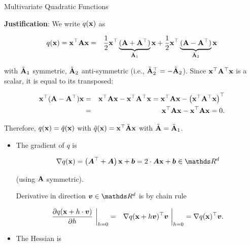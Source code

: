 \begin{vbframe}{Multivariate Quadratic Functions}
  
  \textbf{Justification}: We write $q(\mathbf{x})$ as
  
  \vspace*{-0.3cm}
  
  \begin{eqnarray*}
    q(\mathbf{x}) = \mathbf{x}^\top \mathbf{A} \mathbf{x} &=& \frac{1}{2} \mathbf{x}^\top \underbrace{(\mathbf{A} + \mathbf{A}^\top)}_{\tilde {\mathbf{A}}_1} \mathbf{x} + \frac{1}{2} \mathbf{x}^\top \underbrace{(\mathbf{A} - \mathbf{A}^\top)}_{\tilde {\mathbf{A}}_2} \mathbf{x}
  \end{eqnarray*}
  
  with $\tilde {\mathbf{A}}_1$ symmetric, $\tilde {\mathbf{A}}_2$ anti-symmetric (i.e., $\tilde {\mathbf{A}}_2^\top = - \tilde {\mathbf{A}}_2$). Since $\mathbf{x}^\top \mathbf{A}^\top \mathbf{x}$ is a scalar, it is equal to its transposed: 
  
  \vspace*{-0.3cm}
  
  \begin{eqnarray*}
     \mathbf{x}^\top (\mathbf{A} - \mathbf{A}^\top) \mathbf{x} &=&  \mathbf{x}^\top \mathbf{A} \mathbf{x} - \mathbf{x}^\top \mathbf{A}^\top \mathbf{x} =  \mathbf{x}^\top \mathbf{A} \mathbf{x} - \left(\mathbf{x}^\top \mathbf{A}^\top \mathbf{x}\right)^\top \\
     &=& \mathbf{x}^\top \mathbf{A} \mathbf{x} - \mathbf{x}^\top \mathbf{A} \mathbf{x}  = 0.
  \end{eqnarray*}
  
  Therefore, $q(\mathbf{x}) = \tilde q(\mathbf{x})$ with $\tilde q(\mathbf{x}) = \mathbf{x}^\top \tilde {\mathbf{A}} \mathbf{x}$ with $\tilde {\mathbf{A}} = \tilde {\mathbf{A}}_1$. 
  
  \framebreak 
  
  \begin{itemize}
    \item The gradient of $q$ is 
  
    \begin{eqnarray*}
      \nabla q(\xv) = \left(\bm{A}^\top + \bm{A}\right) \xv + \bm{b} = 2 \cdot \bm{A} \xv + \bm{b} \in \R^d
    \end{eqnarray*}
  
    (using $\mathbf{A}$ symmetric). 
  
    \vspace*{0.2cm}
  
    Derivative in direction $\bm{v}\in \R^d$ is by chain rule
  
    \begin{eqnarray*}
      \frac{\partial q(\mathbf{x} + h \cdot \bm{v})}{\partial h}~\bigg\rvert_{h = 0} &=& \nabla q(\mathbf{x} + h \bm{v})^\top \bm{v}~\bigg\rvert_{h = 0} = \nabla q(\mathbf{x})^\top \bm{v}.
    \end{eqnarray*}
  
  
    \item The Hessian is 
  

\end{itemize}
\end{vbframe}
